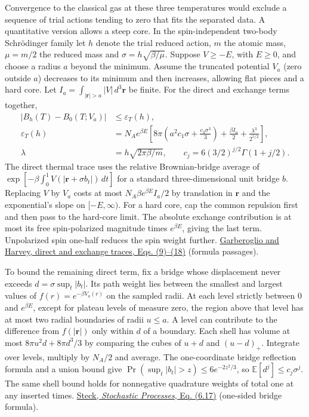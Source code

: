 \documentclass[11pt,a4paper]{article}
\begin{document}
Convergence to the classical gas at these three temperatures would
exclude a sequence of trial actions tending to zero that fits the
separated data. A quantitative version allows a steep core. In the
spin-independent two-body Schrödinger family let \(h\) denote the trial
reduced action, \(m\) the atomic mass, \(\mu=m/2\) the reduced mass and
\(\sigma=h\sqrt{\beta/\mu}\). Suppose \(V\ge-E\), with \(E\ge0\), and
choose a radius \(a\) beyond the minimum. Assume the truncated potential
\(V_a\) (zero outside \(a\)) decreases to its minimum and then
increases, allowing flat pieces and a hard core. Let
\(I_a=\int_{|\mathbf r|>a}|V|\,d^3\mathbf r\) be finite. For the direct
and exchange terms together, \[
\begin{split}
 |B_h(T)-B_0(T;V_a)|&\le \varepsilon_T(h),\\
 \varepsilon_T(h)&=N_A e^{\beta E}
 \left[8\pi\left(a^2c_1\sigma+\frac{c_3\sigma^3}{3}\right)
       +\frac{\beta I_a}{2}+\frac{\lambda^3}{2^{5/2}}\right],\\
 \lambda&=h\sqrt{2\pi\beta/m},\qquad
 c_j=6(3/2)^{j/2}\Gamma(1+j/2).
\end{split}
\] The direct thermal trace uses the relative Brownian-bridge average of
\(\exp[-\beta\int_0^1 V(|\mathbf r+\sigma b_t|)\,dt]\) for a standard
three-dimensional unit bridge \(b\). Replacing \(V\) by \(V_a\) costs at
most \(N_A\beta e^{\beta E} I_a/2\) by translation in \(\mathbf r\) and
the exponential's slope on \([-E,\infty)\). For a hard core, cap the
common repulsion first and then pass to the hard-core limit. The
absolute exchange contribution is at most its free spin-polarized
magnitude times \(e^{\beta E}\), giving the last term. Unpolarized spin
one-half reduces the spin weight further.
\href{https://www.nist.gov/system/files/documents/mml/acmd/fluids_modeling/Harvey-Garberoglio-907690-2.pdf}{Garberoglio
and Harvey, direct and exchange traces, Eqs. (9)--(18)} (formula
passages).

To bound the remaining direct term, fix a bridge whose displacement
never exceeds \(d=\sigma\sup_t|b_t|\). Its path weight lies between the
smallest and largest values of \(f(r)=e^{-\beta V_a(r)}\) on the sampled
radii. At each level strictly between \(0\) and \(e^{\beta E}\), except
for plateau levels of measure zero, the region above that level has at
most two radial boundaries of radii \(u\le a\). A level can contribute
to the difference from \(f(|\mathbf r|)\) only within \(d\) of a
boundary. Each shell has volume at most \(8\pi u^2d+8\pi d^3/3\) by
comparing the cubes of \(u+d\) and \((u-d)_+\). Integrate over levels,
multiply by \(N_A/2\) and average. The one-coordinate bridge reflection
formula and a union bound give \(\Pr(\sup_t |b_t|>z)\le6e^{-2z^2/3}\),
so \(\mathbb E[d^j]\le c_j\sigma^j\). The same shell bound holds for
nonnegative quadrature weights of total one at any inserted times.
\href{https://atomoptics.uoregon.edu/~dsteck/teaching/stochastic-processes/stochastic-notes.pdf}{Steck,
\emph{Stochastic Processes}, Eq. (6.17)} (one-sided bridge formula).
\end{document}
